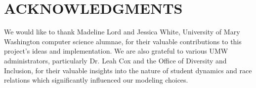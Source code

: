 \section*{ACKNOWLEDGMENTS}

We would like to thank Madeline Lord and Jessica White, University of Mary
Washington computer science alumnae, for their valuable contributions to this
project's ideas and implementation. We are also grateful to various UMW
administrators, particularly Dr. Leah Cox and the Office of Diversity and
Inclusion, for their valuable insights into the nature of student dynamics and
race relations which significantly influenced our modeling choices.
